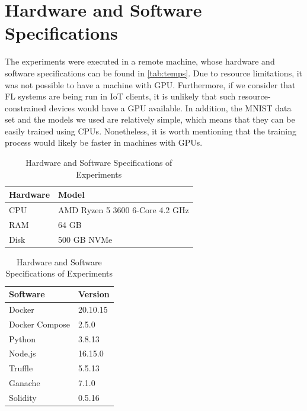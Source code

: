 \section{Hardware and Software Specifications}

The experiments were executed in a remote machine, whose hardware and software specifications can be found in \autoref{tab:temps}. Due to resource limitations, it was not possible to have a machine with GPU. Furthermore, if we consider that FL systems are being run in IoT clients, it is unlikely that such resource-constrained devices would have a GPU available. In addition, the MNIST data set and the models we used are relatively simple, which means that they can be easily trained using CPUs. Nonetheless, it is worth mentioning that the training process would likely be faster in machines with GPUs.

\begin{table}[!h]
    \begin{subtable}[h]{0.59\textwidth}
        \centering
        \begin{tabular}{l|l} \hline \hline
            Hardware & Model                                    \\ \hline \hline
            CPU      & AMD Ryzen 5 3600 6-Core 4.2 GHz          \\ \hline
            RAM      & 64 GB                                    \\ \hline
            Disk     & 500 GB NVMe                              \\ \hline
        \end{tabular}
        \caption{Hardware}
        \label{evaluation:hardware}
    \end{subtable}
    \hfill
    \begin{subtable}[h]{0.39\textwidth}
        \centering
        \begin{tabular}{l|l} \hline \hline
            Software            & Version               \\ \hline \hline
            Docker              & 20.10.15              \\ \hline
            Docker Compose      & 2.5.0                 \\ \hline
            Python              & 3.8.13               \\ \hline
            Node.js             & 16.15.0               \\ \hline
            Truffle             & 5.5.13               \\ \hline
            Ganache             & 7.1.0               \\ \hline
            Solidity            & 0.5.16               \\ \hline
        \end{tabular}
        \caption{Software}
        \label{evaluation:software}
     \end{subtable}
     \caption{Hardware and Software Specifications of Experiments}
     \label{tab:temps}
\end{table}

